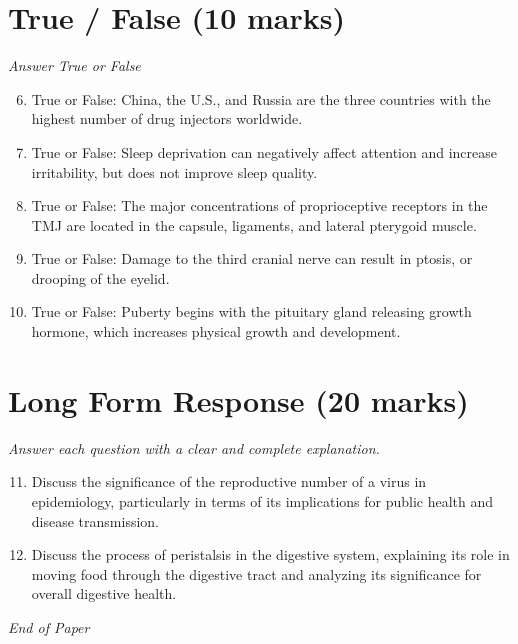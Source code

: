 \documentclass[12pt]{article}
\begin{document}
\section*{True / False (10 marks)}
\textit{Answer True or False}
\begin{enumerate}[label=\arabic*.]
\setcounter{enumi}{5}
\item True or False: China, the U.S., and Russia are the three countries with the highest number of drug injectors worldwide.
\item True or False: Sleep deprivation can negatively affect attention and increase irritability, but does not improve sleep quality.
\item True or False: The major concentrations of proprioceptive receptors in the TMJ are located in the capsule, ligaments, and lateral pterygoid muscle.
\item True or False: Damage to the third cranial nerve can result in ptosis, or drooping of the eyelid.
\item True or False: Puberty begins with the pituitary gland releasing growth hormone, which increases physical growth and development.
\end{enumerate}

\section*{Long Form Response (20 marks)}
\textit{Answer each question with a clear and complete explanation.}
\begin{enumerate}[label=\arabic*.]
\setcounter{enumi}{10}
\item Discuss the significance of the reproductive number of a virus in epidemiology, particularly in terms of its implications for public health and disease transmission.
\item Discuss the process of peristalsis in the digestive system, explaining its role in moving food through the digestive tract and analyzing its significance for overall digestive health.
\end{enumerate}

\vfill
\noindent\textit{End of Paper}
\end{document}
